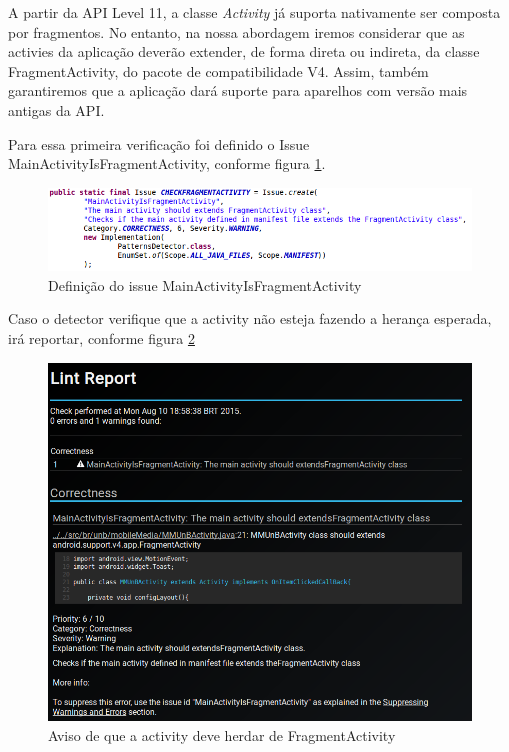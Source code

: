 A partir da API Level 11, a classe {\it Activity} já suporta nativamente ser composta
por fragmentos. No entanto, na nossa abordagem iremos considerar que as activies
da aplicação deverão extender, de forma direta ou indireta, da classe FragmentActivity,
do pacote de compatibilidade V4. Assim, também garantiremos que a aplicação dará
suporte para aparelhos com versão mais antigas da API.

Para essa primeira verificação foi definido o Issue MainActivityIsFragmentActivity,
conforme figura \ref{mainactIsFragAct}.

\begin{figure}[h]
    \centering
    \includegraphics[width=15cm]{img/mainactIsFragAct.png}
    \caption{Definição do issue MainActivityIsFragmentActivity}
    \label{mainactIsFragAct}
\end{figure}

Caso o detector verifique que a activity não esteja fazendo a herança esperada, 
irá reportar, conforme figura \ref{activity_deve_ser_container}

\begin{figure}[h]
    \centering
    \includegraphics[width=15cm]{img/activity_deve_ser_container.png}
    \caption{Aviso de que a activity deve herdar de FragmentActivity}
    \label{activity_deve_ser_container}
\end{figure}

